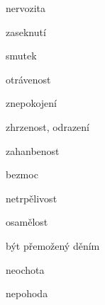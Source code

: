 {\begin{multicols}{2}
\begin{itemize*}
			\item nervozita
			\item zaseknutí
			\item smutek
			\item otrávenost
			\item znepokojení
			\item zhrzenost, odrazení
			\item zahanbenost
			\item bezmoc
			\item netrpělivost
			\item osamělost
			\item být přemožený děním
			\item neochota
			\item nepohoda
		\end{itemize*}
		\end{multicols}
}

